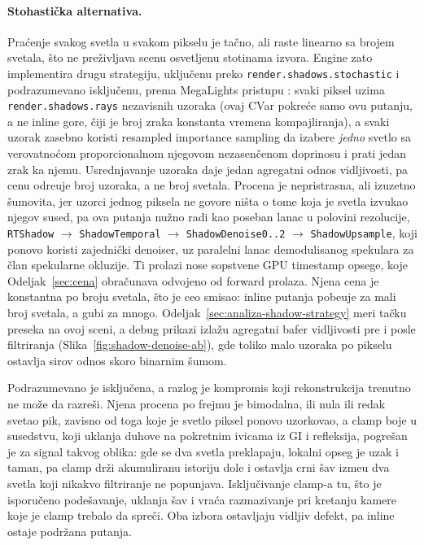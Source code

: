 \paragraph{Stohasti\v{c}ka alternativa.} Pra\'cenje svakog svetla u svakom pikselu je ta\v{c}no, ali raste linearno sa brojem svetala, \v{s}to ne pre\v{z}ivljava scenu osvetljenu stotinama izvora. Engine zato implementira drugu strategiju, uklju\v{c}enu preko \texttt{render.shadows.stochastic} i podrazumevano isklju\v{c}enu, prema MegaLights pristupu \cite{epic_megalights}: svaki piksel uzima \texttt{render.shadows.rays} nezavisnih uzoraka (ovaj CVar pokre\'ce samo ovu putanju, a ne inline gore, \v{c}iji je broj zraka konstanta vremena kompajliranja), a svaki uzorak zasebno koristi resampled importance sampling \cite{talbot2005ris} da izabere \emph{jedno} svetlo sa verovatno\'com proporcionalnom njegovom nezasen\v{c}enom doprinosu i prati jedan zrak ka njemu. Usrednjavanje uzoraka daje jedan agregatni odnos vidljivosti, pa cenu odre\dj{}uje broj uzoraka, a ne broj svetala. Procena je nepristrasna, ali izuzetno \v{s}umovita, jer uzorci jednog piksela ne govore ni\v{s}ta o tome koja je svetla izvukao njegov sused, pa ova putanja nu\v{z}no radi kao poseban lanac u polovini rezolucije, \texttt{RTShadow} $\rightarrow$ \texttt{ShadowTemporal} $\rightarrow$ \texttt{ShadowDenoise0..2} $\rightarrow$ \texttt{ShadowUpsample}, koji ponovo koristi zajedni\v{c}ki denoiser, uz paralelni lanac demodulisanog spekulara za \v{c}lan spekularne okluzije. Ti prolazi nose sopstvene GPU timestamp opsege, koje Odeljak~\ref{sec:cena} obra\v{c}unava odvojeno od forward prolaza. Njena cena je konstantna po broju svetala, \v{s}to je ceo smisao: inline putanja pobe\dj{}uje za mali broj svetala, a gubi za mnogo. Odeljak~\ref{sec:analiza-shadow-strategy} meri ta\v{c}ku preseka na ovoj sceni, a debug prikazi izla\v{z}u agregatni bafer vidljivosti pre i posle filtriranja (Slika~\ref{fig:shadow-denoise-ab}), gde toliko malo uzoraka po pikselu ostavlja sirov odnos skoro binarnim \v{s}umom.

Podrazumevano je isklju\v{c}ena, a razlog je kompromis koji rekonstrukcija trenutno ne mo\v{z}e da razre\v{s}i. Njena procena po frejmu je bimodalna, ili nula ili redak svetao pik, zavisno od toga koje je svetlo piksel ponovo uzorkovao, a clamp boje u susedstvu, koji uklanja duhove na pokretnim ivicama iz GI i refleksija, pogre\v{s}an je za signal takvog oblika: gde se dva svetla preklapaju, lokalni opseg je uzak i taman, pa clamp dr\v{z}i akumuliranu istoriju dole i ostavlja crni \v{s}av izme\dj{}u dva svetla koji nikakvo filtriranje ne popunjava. Isklju\v{c}ivanje clamp-a tu, \v{s}to je isporu\v{c}eno pode\v{s}avanje, uklanja \v{s}av i vra\'ca razmazivanje pri kretanju kamere koje je clamp trebalo da spre\v{c}i. Oba izbora ostavljaju vidljiv defekt, pa inline ostaje podr\v{z}ana putanja.

